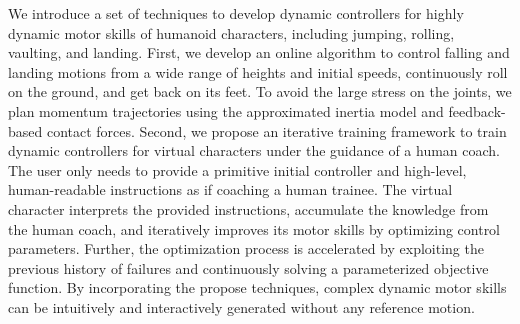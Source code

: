 \begin{summary}

We introduce a set of techniques to develop 
dynamic controllers for highly dynamic motor skills of humanoid characters,
including jumping, rolling, vaulting, and landing.
First, we develop an online algorithm to control falling and landing motions 
from a wide range of heights and initial speeds, 
continuously roll on the ground, and get back on its feet.
To avoid the large stress on the joints, we plan momentum trajectories 
using the approximated inertia model and feedback-based contact forces.
Second, we propose an iterative training framework to train dynamic 
controllers for virtual characters under the guidance of a human coach.
The user only needs to provide a primitive initial controller and high-level, 
human-readable instructions as if coaching a human trainee.
The virtual character interprets the provided instructions,
accumulate the knowledge from the human coach,
and iteratively improves its motor skills by optimizing control parameters.
Further, the optimization process is accelerated by 
exploiting the previous history of failures and 
continuously solving a parameterized objective function.
By incorporating the propose techniques, complex dynamic motor skills
can be intuitively and interactively generated without any reference motion.




\end{summary}
